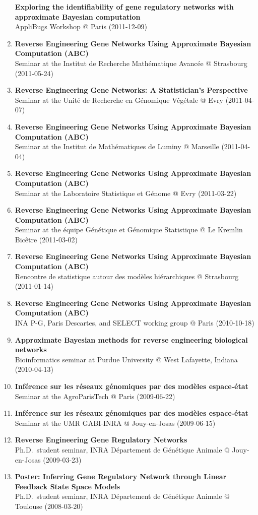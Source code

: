\documentclass[11pt, a4paper]{awesome-cv}
\begin{document}
\begin{enumerate}
  \textbf{Exploring the identifiability of gene regulatory networks with
  approximate Bayesian computation}\\
  AppliBugs Workshop @ Paris (2011-12-09)
\item
  \textbf{Reverse Engineering Gene Networks Using Approximate Bayesian
  Computation (ABC)}\\
  Seminar at the Institut de Recherche Mathématique Avancée @ Strasbourg
  (2011-05-24)
\item
  \textbf{Reverse Engineering Gene Networks: A Statistician's
  Perspective}\\
  Seminar at the Unité de Recherche en Génomique Végétale @ Evry
  (2011-04-07)
\item
  \textbf{Reverse Engineering Gene Networks Using Approximate Bayesian
  Computation (ABC)}\\
  Seminar at the Institut de Mathématiques de Luminy @ Marseille
  (2011-04-04)
\item
  \textbf{Reverse Engineering Gene Networks Using Approximate Bayesian
  Computation (ABC)}\\
  Seminar at the Laboratoire Statistique et Génome @ Evry (2011-03-22)
\item
  \textbf{Reverse Engineering Gene Networks Using Approximate Bayesian
  Computation (ABC)}\\
  Seminar at the équipe Génétique et Génomique Statistique @ Le Kremlin
  Bicêtre (2011-03-02)
\item
  \textbf{Reverse Engineering Gene Networks Using Approximate Bayesian
  Computation (ABC)}\\
  Rencontre de statistique autour des modèles hiérarchiques @ Strasbourg
  (2011-01-14)
\item
  \textbf{Reverse Engineering Gene Networks Using Approximate Bayesian
  Computation (ABC)}\\
  INA P-G, Paris Descartes, and SELECT working group @ Paris
  (2010-10-18)
\item
  \textbf{Approximate Bayesian methods for reverse engineering
  biological networks}\\
  Bioinformatics seminar at Purdue University @ West Lafayette, Indiana
  (2010-04-13)
\item
  \textbf{Inférence sur les réseaux génomiques par des modèles
  espace-état}\\
  Seminar at the AgroParisTech @ Paris (2009-06-22)
\item
  \textbf{Inférence sur les réseaux génomiques par des modèles
  espace-état}\\
  Seminar at the UMR GABI-INRA @ Jouy-en-Josas (2009-06-15)
\item
  \textbf{Reverse Engineering Gene Regulatory Networks}\\
  Ph.D.~student seminar, INRA Département de Génétique Animale @
  Jouy-en-Josas (2009-03-23)
\item
  \textbf{Poster: Inferring Gene Regulatory Network through Linear
  Feedback State Space Models}\\
  Ph.D.~student seminar, INRA Département de Génétique Animale @
  Toulouse (2008-03-20)
\end{enumerate}
\end{document}
